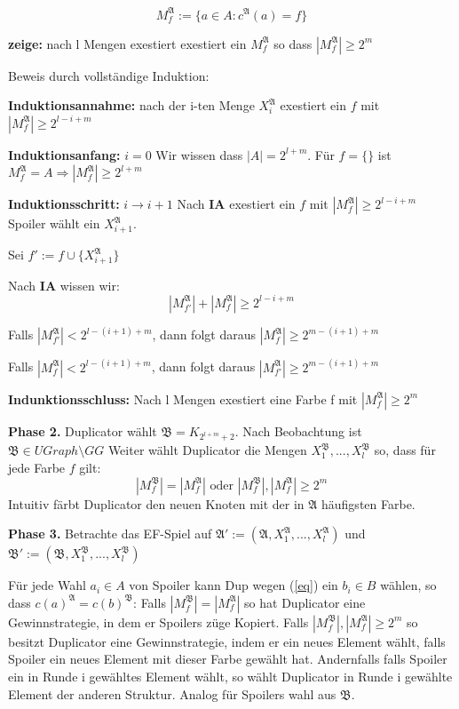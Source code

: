 \documentclass[12pt]{article}
\begin{document}
\[ M_f^\mathfrak{A} := \{ a \in A : c^\mathfrak{A}(a) = f \} \] 

\textbf{zeige: } nach l Mengen exestiert exestiert ein $M_f^\mathfrak{A}$ so 
dass $|M_f^\mathfrak{A}| \geq 2^m$

  Beweis durch vollständige Induktion: 
  
  \textbf{Induktionsannahme:} nach der i-ten Menge $X_i^\mathfrak{A}$ exestiert
  ein $f$ mit $|M_f^\mathfrak{A}| \geq 2^{l-i+m}$

  \textbf{Induktionsanfang:} $i=0$ Wir wissen dass $|A| = 2^{l+m}$. Für $f=\{\}$
  ist $M_f^\mathfrak{A} = A \Rightarrow |M_f^\mathfrak{A}|\geq 2^{l+m}$

  \textbf{Induktionsschritt:} $i \rightarrow i+1$
  Nach \textbf{IA} exestiert ein $f$ mit $|M_f^\mathfrak{A}|\geq 2^{l-i+m}$
  Spoiler wählt ein $X_{i+1}^\mathfrak{A}$.

  Sei $f' := f \cup \{X_{i+1}^\mathfrak{A}\}$

  Nach \textbf{IA} wissen wir:
  \[ |M_{f'}^\mathfrak{A}| + |M_f^\mathfrak{A}| \geq 2^{l-i+m} \] 

  Falls $|M_{f'}^\mathfrak{A}| < 2^{l-(i+1)+m}$, dann folgt daraus 
  $|M_f^\mathfrak{A}|\geq 2^{m-(i+1)+m}$

  Falls $|M_f^\mathfrak{A}| < 2^{l-(i+1)+m}$, dann folgt daraus 
  $|M_{f'}^\mathfrak{A}|\geq 2^{m-(i+1)+m}$

  \textbf{Indunktionsschluss:} Nach l Mengen exestiert eine Farbe f mit 
  $|M_f^\mathfrak{A}|\geq 2^{m}$
  
\textbf{Phase 2.} Duplicator wählt $\mathfrak{B} = K_{2^{l+m}+2}$. Nach Beobachtung
ist $\mathfrak{B}\in UGraph \setminus GG$
Weiter wählt Duplicator die Mengen $X_1^\mathfrak{B}, ..., X_l^\mathfrak{B}$ so, 
dass für jede Farbe $f$ gilt:
\begin{equation}
  |M_f^\mathfrak{B}|=|M_f^\mathfrak{A}|\text{ oder } |M_f^\mathfrak{B}|,|M_f^\mathfrak{A}|
  \geq 2^m \label{eq}
\end{equation}
Intuitiv färbt Duplicator den neuen Knoten mit der in $\mathfrak{A}$ häufigsten Farbe.

\textbf{Phase 3.} Betrachte das EF-Spiel auf $\mathfrak{A}' := (\mathfrak{A}, 
X_1^\mathfrak{A}, ... , X_l^\mathfrak{A})$ und $\mathfrak{B}' := (\mathfrak{B}, 
X_1^\mathfrak{B}, ... , X_l^\mathfrak{B})$

Für jede Wahl $a_i\in A$ von Spoiler kann Dup wegen (\ref{eq}) ein $b_i\in B$ wählen,
so dass $c(a)^\mathfrak{A} = c(b)^\mathfrak{B}$:
Falls $|M_f^\mathfrak{B}|=|M_f^\mathfrak{A}|$ so hat Duplicator eine Gewinnstrategie, 
in dem er Spoilers züge Kopiert. Falls $|M_f^\mathfrak{B}|,|M_f^\mathfrak{A}|
\geq 2^m $ so besitzt Duplicator eine Gewinnstrategie, indem er ein neues Element wählt,
falls Spoiler ein neues Element mit dieser Farbe gewählt hat. Andernfalls falls Spoiler
ein in Runde i gewähltes Element wählt, so wählt Duplicator in Runde i gewählte Element
der anderen Struktur. 
Analog für Spoilers wahl aus $\mathfrak{B}$.
\end{document}
